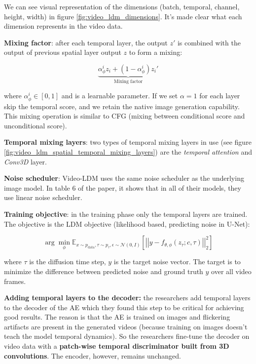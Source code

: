 We can see visual representation of the dimensions (batch, temporal, channel, height, width) in figure \ref{fig:video_ldm_dimensions}. It's made clear what each dimension represents in the video data.



\textbf{Mixing factor}: after each temporal layer, the output $z'$ is combined with the output of previous spatial layer output $z$ to form a mixing: 

\[ \underbrace{\alpha_\phi^i z_{i} + (1 - \alpha_\phi^i) z_{i}'}_{\text{Mixing factor}} \] 

where $\alpha_\phi^i \in [0, 1]$ and is a learnable parameter. If we set $\alpha = 1$ for each layer skip the temporal score, and we retain the native image generation capability. This mixing operation is similar to CFG (mixing between conditional score and unconditional score).

\textbf{Temporal mixing layers}: two types of temporal mixing layers in use (see figure \ref{fig:video_ldm_spatial_temporal_mixing_layers}) are the \textit{temporal attention} and \textit{Conv3D} layer.

\textbf{Noise scheduler}: Video-LDM uses the same noise scheduler as the underlying image model. In table 6 of the paper, it shows that in all of their models, they use linear noise scheduler.

\textbf{Training objective}: in the training phase only the temporal layers are trained. The objective is the LDM objective (likelihood based, predicting noise in U-Net):

\[ \arg \min_\phi \mathbb{E}_{x \sim p_{\text{data}}, \tau \sim p_{\tau}, \epsilon \sim \mathcal{N} (0, I)} \left[ \left| \left| y - f_{\theta,\phi} (z_{\tau} ; c, \tau) \right| \right|^2_2 \right] \]

where $\tau$ is the diffusion time step, $y$ is the target noise vector. The target is to minimize the difference between predicted noise and ground truth $y$ over all video frames.

\textbf{Adding temporal layers to the decoder:} the researchers add temporal layers to the decoder of the AE which they found this step to be critical for achieving good results. The reason is that the AE is trained on images and flickering artifacts are present in the generated videos (because training on images doesn't teach the model temporal dynamics). So the researchers fine-tune the decoder on video data with a \textbf{patch-wise temporal discriminator built from 3D convolutions}. The encoder, however, remains unchanged.


